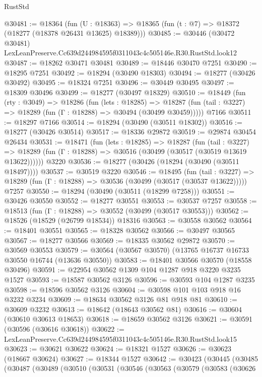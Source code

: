 \begin{lexlean}{RustStd}
\begin{coremodule}
@30481 := @18364
    (fun (U : @18363) => @18365 (fun (t : @7) => @18372 (@18277 (@18378 @26431 @13625) @18389)))
@30485 := @30446
    (@30472 @30481)
    LexLeanPreserve.Cc639d244984595f0311043c4c505146e.R30.RustStd.look12
@30487 := @18262 @30471 @30481
@30489 := @18446 @30470 @7251
@30490 := @18295 @7251
@30492 := @18294 (@30490 @18303)
@30494 := @18277 (@30426 @30492)
@30495 := @18324 @7251
@30496 := @30449 @30495
@30497 := @18309 @30496
@30499 := @18277 (@30497 @18329)
@30510 := @18449
    (fun (rty : @3049) =>
    @18286
      (fun (lets : @18285) =>
      @18287 (fun (tail : @3227) => @18289 (fun (Γ : @18288) => @30494 (@30499 @30459)))))
    @7166
@30511 := @18297 @7166
@30514 := @18294 (@30490 (@30511 @18302))
@30516 := @18277 (@30426 @30514)
@30517 := @18336 @29872
@30519 := @29874 @30454 @26434
@30531 := @18471
    (fun (lets : @18285) =>
    @18287
      (fun (tail : @3227) =>
      @18289 (fun (Γ : @18288) => @30516 (@30499 (@30517 (@30519 @13619 @13622))))))
    @3220
@30536 := @18277 (@30426 (@18294 (@30490 (@30511 @18497))))
@30537 := @30519 @3220
@30546 := @18495
    (fun (tail : @3227) => @18289 (fun (Γ : @18288) => @30536 (@30499 (@30517 (@30537 @13622)))))
    @7257
@30550 := @18294 (@30490 (@30511 (@18299 @7258)))
@30551 := @30426 @30550
@30552 := @18277 @30551
@30553 := @30537 @7257
@30558 := @18513 (fun (Γ : @18288) => @30552 (@30499 (@30517 @30553)))
@30562 := @18526 (@18529 (@26799 @18534)) @18316
@30563 := @30558 @30562
@30564 := @18401 @30551
@30565 := @18328 @30562
@30566 := @30497 @30565
@30567 := @18277 @30566
@30569 := @18335 @30562 @29872
@30570 := @30569 @30553
@30579 := @30564 (@30567 @30570) (@13765 @16737 @16733 @30550 @16744 (@13636 @30550))
@30583 := @18401 @30566 @30570 (@18558 @30496)
@30591 := @22954 @30562 @1309 @104 @1287 @918 @3220 @3235 @1527
@30593 := @18587 @30562 @3126
@30596 := @30593 @104 @1287 @3235
@30598 := @18596 @30562 @3126
@30604 := @30598 @101 @103 @918 @16 @3232 @3234
@30609 := @18634 @30562 @3126 @81 @918 @81
@30610 := @30609 @3232
@30613 := @18642 (@18643 @30562 @81)
@30616 := @30604 (@30610 @30613 @18653)
@30618 := @18659 @30562 @3126
@30621 := @30591 (@30596 (@30616 @30618))
@30622 := LexLeanPreserve.Cc639d244984595f0311043c4c505146e.R30.RustStd.look15
@30623 := @30621 @30622
@30624 := @18321 @1527
@30626 := @30623 (@18667 @30624)
@30627 := @18344 @1527
@30642 := @30423
    (@30445
      (@30485
        (@30487
          (@30489
            (@30510
              (@30531
                (@30546
                  (@30563
                    (@30579
                      (@30583
                        (@30626

\end{coremodule}
\end{lexlean}

